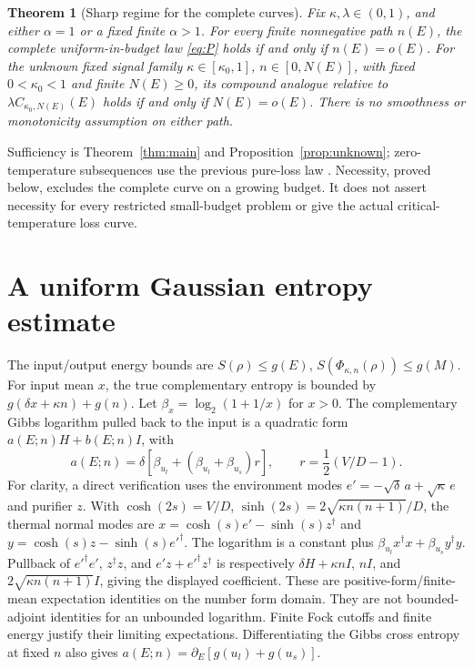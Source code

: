 \documentclass[11pt]{article}
\newtheorem{theorem}{Theorem}
\newcommand{\PhiT}{\Phi_{\kappa,n}}
\begin{document}
\begin{theorem}[Sharp regime for the complete curves]\label{thm:sharp}
Fix \(\kappa,\lambda\in(0,1)\), and either \(\alpha=1\) or a fixed finite
\(\alpha>1\). For every finite nonnegative path \(n(E)\), the complete
uniform-in-budget law \eqref{eq:P} holds if and only if \(n(E)=o(E)\).
For the unknown fixed signal family
\(\kappa\in[\kappa_0,1]\), \(n\in[0,N(E)]\), with fixed
\(0<\kappa_0<1\) and finite \(N(E)\ge0\), its compound analogue relative
to \(\lambda C_{\kappa_0,N(E)}(E)\) holds if and only if \(N(E)=o(E)\).
There is no smoothness or monotonicity assumption on either path.
\end{theorem}
Sufficiency is Theorem~\ref{thm:main} and
Proposition~\ref{prop:unknown}; zero-temperature subsequences use the
previous pure-loss law \cite{previous}.
Necessity, proved below, excludes the complete curve on a growing
budget. It does not assert necessity for every restricted small-budget
problem or give the actual critical-temperature loss curve.

\section{A uniform Gaussian entropy estimate}
The input/output energy bounds are
\(S(\rho)\le g(E)\), \(S(\PhiT(\rho))\le g(M)\).
For input mean \(x\), the true complementary entropy is bounded by
\(g(\delta x+\kappa n)+g(n)\).
Let \(\beta_x=\log_2(1+1/x)\) for \(x>0\).
The complementary Gibbs logarithm pulled back to the input is a
quadratic form \(a(E;n)H+b(E;n)I\), with
\[
 a(E;n)=\delta\left[\beta_{u_l}
           +(\beta_{u_l}+\beta_{u_s})r\right],
 \qquad r=\frac12(V/D-1).
 \label{eq:a}
\]
For clarity, a direct verification uses the environment modes
\(e'=-\sqrt\delta\,a+\sqrt\kappa\,e\) and purifier \(z\).
With \(\cosh(2s)=V/D\), \(\sinh(2s)=2\sqrt{\kappa n(n+1)}/D\),
the thermal normal modes are
\(x=\cosh(s)e'-\sinh(s)z^\dagger\) and
\(y=\cosh(s)z-\sinh(s)e'^\dagger\).
The logarithm is a constant plus
\(\beta_{u_l}x^\dagger x+\beta_{u_s}y^\dagger y\).
Pullback of \(e'^\dagger e'\), \(z^\dagger z\), and
\(e'z+e'^\dagger z^\dagger\) is respectively
\(\delta H+\kappa nI\), \(nI\), and
\(2\sqrt{\kappa n(n+1)}I\), giving the displayed coefficient.
These are positive-form/finite-mean expectation identities on the number
form domain. They are not bounded-adjoint identities for an unbounded
logarithm. Finite Fock cutoffs and finite energy justify their limiting
expectations. Differentiating the Gibbs cross entropy at fixed \(n\)
also gives \(a(E;n)=\partial_E[g(u_l)+g(u_s)]\).
\end{document}
